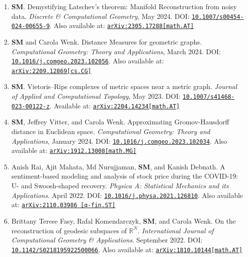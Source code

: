 \documentclass[11pt]{article}
\begin{document}
\begin{enumerate}
\item[6.] \textbf{SM}. Demystifying Latschev's theorem: Manifold Reconstruction
from noisy data. \emph{Discrete \& Computational Geometry}, May 2024. 
DOI: \href{https://doi.org/10.1007/s00454-024-00655-9}{\tt 10.1007/s00454-024-00655-9}. 
Also available at:
\href{https://arxiv.org/abs/2305.17288}{\tt arXiv:2305.17288[math.AT]}

\item[5.] \textbf{SM} and Carola Wenk. Distance Measures for geometric graphs.
\emph{Computational Geometry: Theory and Applications}, March 2024. 
DOI: \href{https://doi.org/10.1016/j.comgeo.2023.102056}{\tt 10.1016/j.comgeo.2023.102056}. Also available at: \href{https://arxiv.org/abs/2209.12869}{\tt arXiv:2209.12869[cs.CG]}

\item[4.] \textbf{SM}. Vietoris--Rips complexes of metric spaces near a 
metric graph. \emph{Journal of Applied and Computational Topology}, May 2023.
DOI: \href{https://doi.org/10.1007/s41468-023-00122-z}{\tt 10.1007/s41468-023-00122-z}.
Available at: \href{https://arxiv.org/abs/2204.14234}{\tt arXiv:2204.14234[math.AT]}

\item[3.] \textbf{SM}, Jeffrey Vitter, and Carola Wenk. 
Approximating Gromov-Hausdorff distance in Euclidean space. 
\emph{Computational Geometry: Theory and Applications}, January 2024.
DOI: \href{https://doi.org/10.1016/j.comgeo.2023.102034}{\tt 10.1016/j.comgeo.2023.102034}.
Also available at: \href{https://arxiv.org/abs/1912.13008}{\tt arXiv:1912.13008[math.MG]}

\item[2.] Anish Rai, Ajit Mahata, Md Nurujjaman, \textbf{SM}, and Kanish Debnath. A sentiment-based 
modeling and analysis of stock price during the COVID-19: U- and Swoosh-shaped recovery. 
\emph{Physica A: Statistical Mechanics and its Applications}. April 2022.
DOI: \href{https://www.sciencedirect.com/science/article/pii/S0378437121009778}{\tt 10.1016/j.physa.2021.126810}. Also available at: \href{https://arxiv.org/abs/2110.03986}{\tt arXiv:2110.03986 [q-fin.ST]}

\item[1.] Brittany Terese Fasy, Rafal Komendarczyk, \textbf{SM}, and Carola Wenk. On the reconstruction of
geodesic subspaces of $\mathbb R^N$. \emph{International Journal of Computational Geometry \& Applications}. September
2022. DOI: \href{https://www.worldscientific.com/doi/10.1142/S0218195922500066}{\tt 10.1142/S0218195922500066}.
Also available at: \href{https://arxiv.org/abs/1810.10144}{\tt arXiv:1810.10144[math.AT]}
\end{enumerate}
\end{document}
